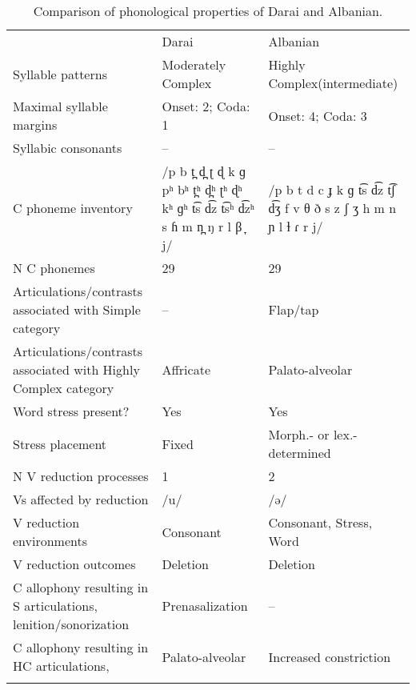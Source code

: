 \begin{table}
\small
\begin{tabularx}{\textwidth}{III}
\lsptoprule
 & {Darai} & {Albanian}\\
 {Syllable patterns} & Moderately Complex & Highly Complex\newline (intermediate)\\
 \midrule 
 {Maximal syllable margins} & Onset: 2; Coda: 1 & Onset: 4; Coda: 3\\
 \tablevspace
 {Syllabic consonants} & -- & --\\
 \tablevspace
 {C phoneme inventory} & /p b t̪ d̪ ʈ ɖ k ɡ pʰ bʰ t̪ʰ d̪ʰ ʈʰ ɖʰ kʰ ɡʰ t͡s d͡z t͡sʰ d͡zʰ s ɦ m n̪ ŋ r l β ̞ j/ & /p b t d c ɟ k ɡ t͡s d͡z t͡ʃ d͡ʒ f v θ ð s z ʃ ʒ h m n ɲ l ɫ ɾ r j/\\
 \tablevspace
 {N C phonemes} & 29 & 29\\
 \tablevspace
 {Articulations/contrasts associated with {Simple}} {category} & {--} & {Flap/tap}\\
 \tablevspace
 {Articulations/contrasts associated with {Highly Complex}} {category} & {Affricate} & { {Palato-alveolar}}\\
 \tablevspace
 {Word stress present?} & {Yes} & {Yes}\\
 \tablevspace
 {Stress placement} & {Fixed} & {Morph.- or lex.-determined}\\
 \tablevspace
 {N V reduction processes} & {1} & {2}\\
 \tablevspace
 {Vs affected by reduction}  & {/u/} & {/ə/}\\
 \tablevspace
 {V reduction environments} & {Consonant} & {Consonant, Stress, Word}\\
 \tablevspace
 {V reduction outcomes} & {Deletion} & {Deletion}\\
 \tablevspace
 {C allophony resulting in S articulations, lenition/sonorization} & { {Prenasalization}} & {--}\\
 \tablevspace
{ {C allophony resulting in HC articulations,} } & { {Palato-alveolar}} & {Increased constriction}\\
\lspbottomrule
\end{tabularx}
\caption{\label{tab:8.6}Comparison of phonological properties of Darai and Albanian.}
\end{table}

